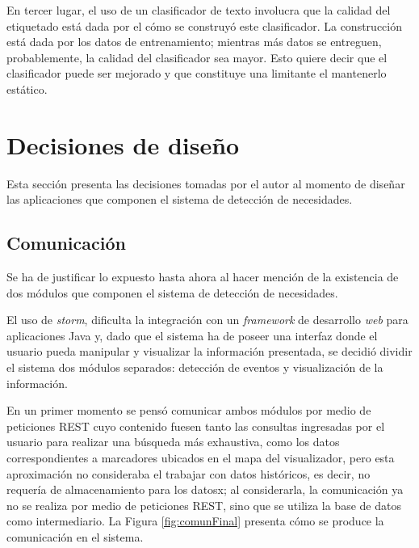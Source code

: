 En tercer lugar, el uso de un clasificador de texto involucra que la calidad del etiquetado está dada por el cómo se construyó este clasificador. La construcción está dada por los datos de entrenamiento; mientras más datos se entreguen, probablemente, la calidad del clasificador sea mayor. Esto quiere decir que el clasificador puede ser mejorado y que constituye una limitante el mantenerlo estático.

\section{Decisiones de diseño}
\label{sec:decDiseno}

Esta sección presenta las decisiones tomadas por el autor al momento de diseñar las aplicaciones que componen el sistema de detección de necesidades.

\subsection{Comunicación}
\label{sec:diseno:comunicacion}

Se ha de justificar lo expuesto hasta ahora al hacer mención de la existencia de dos módulos que componen el sistema de detección de necesidades. 

El uso de \textit{storm}, dificulta la integración con un \textit{framework} de desarrollo \textit{web} para aplicaciones Java y, dado que el sistema ha de poseer una interfaz donde el usuario pueda manipular y visualizar la información presentada, se decidió dividir el sistema dos módulos separados: detección de eventos y visualización de la información.

En un primer momento se pensó comunicar ambos módulos por medio de peticiones REST cuyo contenido fuesen tanto las consultas ingresadas por el usuario para realizar una búsqueda más exhaustiva, como los datos correspondientes a marcadores ubicados en el mapa del visualizador, pero esta aproximación no consideraba el trabajar con datos históricos, es decir, no requería de almacenamiento para los datosx; al considerarla, la comunicación ya no se realiza por medio de peticiones REST, sino que se utiliza la base de datos como intermediario. La Figura \ref{fig:comunFinal} presenta cómo se produce la comunicación en el sistema.


